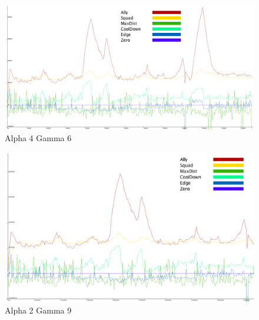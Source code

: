\begin{figure}[H]
\includegraphics[angle=-90, scale=0.45]{Figures/learningrate/A4G6/test.png}
\caption{Alpha 4 Gamma 6}
\label{fig:app_a4g6_test}
\end{figure}
\begin{figure}[H]
\includegraphics[angle=-90, scale=0.45]{Figures/learningrate/A2G9/test.png}
\caption{Alpha 2 Gamma 9}
\label{fig:app_a2g9_test}
\end{figure}	

\newpage
